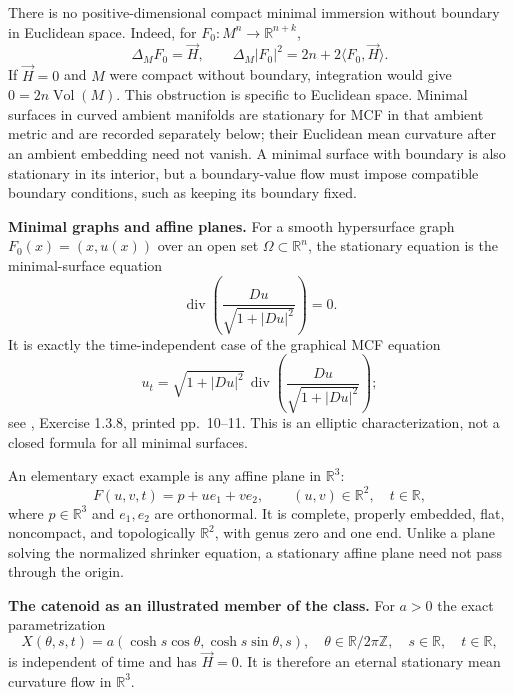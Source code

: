 \begin{example}
There is no positive-dimensional compact minimal immersion without boundary in Euclidean space. Indeed, for $F_0:M^n\to\mathbb R^{n+k}$,
\[
 \Delta_M F_0=\vec H,\qquad
 \Delta_M|F_0|^2=2n+2\langle F_0,\vec H\rangle.
\]
If $\vec H=0$ and $M$ were compact without boundary, integration would give $0=2n\operatorname{Vol}(M)$. This obstruction is specific to Euclidean space. Minimal surfaces in curved ambient manifolds are stationary for MCF in that ambient metric and are recorded separately below; their Euclidean mean curvature after an ambient embedding need not vanish. A minimal surface with boundary is also stationary in its interior, but a boundary-value flow must impose compatible boundary conditions, such as keeping its boundary fixed.

\textbf{Minimal graphs and affine planes.}
For a smooth hypersurface graph $F_0(x)=(x,u(x))$ over an open set $\Omega\subset\mathbb R^n$, the stationary equation is the minimal-surface equation
\[
 \operatorname{div}\left(\frac{Du}{\sqrt{1+|Du|^2}}\right)=0.
\]
It is exactly the time-independent case of the graphical MCF equation
\[
 u_t=\sqrt{1+|Du|^2}\,\operatorname{div}\left(\frac{Du}{\sqrt{1+|Du|^2}}\right);
\]
see \cite{CatMan11}, Exercise 1.3.8, printed pp.~10--11. This is an elliptic characterization, not a closed formula for all minimal surfaces.

An elementary exact example is any affine plane in $\mathbb R^3$:
\[
 F(u,v,t)=p+u e_1+v e_2,\qquad (u,v)\in\mathbb R^2,\quad t\in\mathbb R,
\]
where $p\in\mathbb R^3$ and $e_1,e_2$ are orthonormal. It is complete, properly embedded, flat, noncompact, and topologically $\mathbb R^2$, with genus zero and one end. Unlike a plane solving the normalized shrinker equation, a stationary affine plane need not pass through the origin.

\textbf{The catenoid as an illustrated member of the class.}
For $a>0$ the exact parametrization
\[
 X(\theta,s,t)=a(\cosh s\cos\theta,\cosh s\sin\theta,s),
 \quad \theta\in\mathbb R/2\pi\mathbb Z,\quad s\in\mathbb R,\quad t\in\mathbb R,
\]
is independent of time and has $\vec H=0$. It is therefore an eternal stationary mean curvature flow in $\mathbb R^3$.


\end{example}
